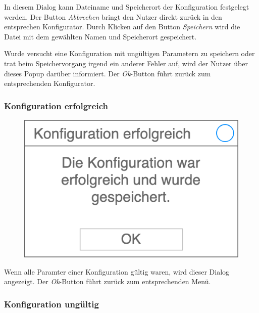     In diesem Dialog kann Dateiname und Speicherort der Konfiguration festgelegt werden. Der Button \textit{Abbrechen} bringt den Nutzer direkt zurück in den entsprechen Konfigurator. Durch Klicken auf den Button \textit{Speichern} wird die Datei mit dem gewählten Namen und Speicherort gespeichert.

    Wurde versucht eine Konfiguration mit ungültigen Parametern zu speichern oder trat beim Speichervorgang irgend ein anderer Fehler auf, wird der Nutzer über dieses Popup darüber informiert. Der \textit{Ok}-Button führt zurück zum entsprechenden Konfigurator.

    \subsubsection{Konfiguration erfolgreich}

    \begin{figure}[H]
        \centering
        \includegraphics[width=\textwidth/2]{images/konfiguration_erfolgreich}
    \end{figure}

    Wenn alle Paramter einer Konfiguration gültig waren, wird dieser Dialog angezeigt. Der \textit{Ok}-Button führt zurück zum entsprechenden Menü.

    \subsubsection{Konfiguration ungültig}

